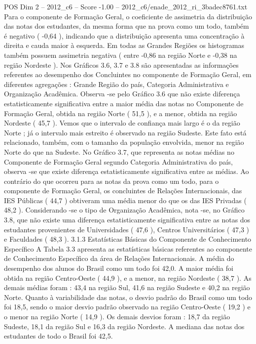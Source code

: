 \begin{textsample}{POS Dim 2 – 2012\_c6 – Score -1.00 – 2012\_c6/enade\_2012\_ri\_3badec8761.txt}
Para o componente de Formação Geral, o coeficiente de assimetria da distribuição das notas dos estudantes, da mesma forma que na prova como um todo, também é negativo ( -0,64 ), indicando que a distribuição apresenta uma concentração à direita e cauda maior à esquerda.
Em todas as Grandes Regiões os histogramas também possuem assimetria negativa ( entre -0,86 na região Norte e -0,38 na região Nordeste ).
Nos Gráficos 3.6, 3.7 e 3.8 são apresentadas as informações referentes ao desempenho dos Concluintes no componente de Formação Geral, em diferentes agregações : Grande Região do país, Categoria Administrativa e Organização Acadêmica.
Observa -se pelo Gráfico 3.6 que não existe diferença estatisticamente significativa entre a maior média das notas no Componente de Formação Geral, obtida na região Norte ( 51,5 ), e a menor, obtida na região Nordeste ( 45,7 ).
Vemos que o intervalo de confiança mais largo é o da região Norte ; já o intervalo mais estreito é observado na região Sudeste.
Este fato está relacionado, também, com o tamanho da população envolvida, menor na região Norte do que na Sudeste.
No Gráfico 3.7, que representa as notas médias no Componente de Formação Geral segundo Categoria Administrativa do país, observa -se que existe diferença estatisticamente significativa entre as médias.
Ao contrário do que ocorreu para as notas da prova como um todo, para o componente de Formação Geral, os concluintes de Relações Internacionais, das IES Públicas ( 44,7 ) obtiveram uma média menor do que os das IES Privadas ( 48,2 ).
Considerando -se o tipo de Organização Acadêmica, nota -se, no Gráfico 3.8, que não existe uma diferença estatisticamente significativa entre as notas dos estudantes provenientes de Universidades ( 47,6 ), Centros Universitários ( 47,3 ) e Faculdades ( 48,3 ). 3.1.3 Estatísticas Básicas do Componente de Conhecimento Específico A Tabela 3.3 apresenta as estatísticas básicas referentes ao componente de Conhecimento Específico da área de Relações Internacionais.
A média do desempenho dos alunos do Brasil como um todo foi 42,0.
A maior média foi obtida na região Centro-Oeste ( 44,9 ), e a menor, na região Nordeste ( 38,7 ).
As demais médias foram : 43,4 na região Sul, 41,6 na região Sudeste e 40,2 na região Norte.
Quanto à variabilidade das notas, o desvio padrão do Brasil como um todo foi 18,5, sendo o maior desvio padrão observado na região Centro-Oeste ( 19,2 ) e o menor na região Norte ( 14,9 ).
Os demais desvios foram : 18,7 da região Sudeste, 18,1 da região Sul e 16,3 da região Nordeste.
A mediana das notas dos estudantes de todo o Brasil foi 42,5.

\end{textsample}
